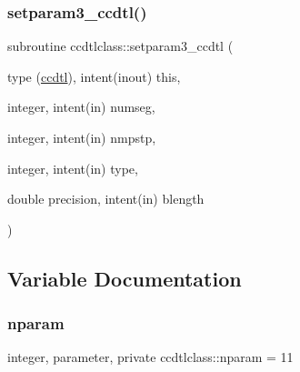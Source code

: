 \mbox{\label{namespaceccdtlclass_a3632b0f42925964cedb7778792da563f}} 
\subsubsection{\texorpdfstring{setparam3\_ccdtl()}{setparam3\_ccdtl()}}
{\footnotesize\ttfamily subroutine ccdtlclass\+::setparam3\+\_\+ccdtl (\begin{DoxyParamCaption}\item[{type (\mbox{\hyperlink{namespaceccdtlclass_structccdtlclass_1_1ccdtl}{ccdtl}}), intent(inout)}]{this,  }\item[{integer, intent(in)}]{numseg,  }\item[{integer, intent(in)}]{nmpstp,  }\item[{integer, intent(in)}]{type,  }\item[{double precision, intent(in)}]{blength }\end{DoxyParamCaption})}



\subsection{Variable Documentation}
\mbox{\label{namespaceccdtlclass_a0e8e95c86f2dab6639fc79f05859b6ea}} 
\subsubsection{\texorpdfstring{nparam}{nparam}}
{\footnotesize\ttfamily integer, parameter, private ccdtlclass\+::nparam = 11\hspace{0.3cm}{\ttfamily [private]}}

